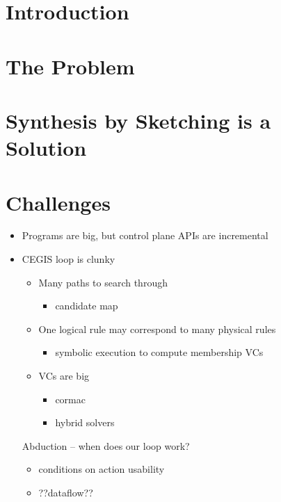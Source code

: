 \section{Introduction}


\section{The Problem}

\section{Synthesis by Sketching is a Solution}


\section{Challenges}
\begin{itemize}
\item Programs are big, but control plane APIs are incremental
\item CEGIS loop is clunky
  \begin{itemize}
  \item Many paths to search through
    \begin{itemize} \item candidate map \end{itemize}
  \item One logical rule may correspond to many physical rules
    \begin{itemize} \item symbolic execution to compute membership VCs \end{itemize}
  \item VCs are big
    \begin{itemize}
    \item cormac
    \item hybrid solvers
    \end{itemize}
  \end{itemize}
Abduction -- when does our loop work?
  \begin{itemize}
  \item conditions on action usability
  \item ??dataflow??
  \end{itemize}
\end{itemize}

